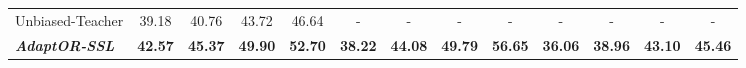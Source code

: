 \begin{table*}[htb!]
{\begin{tabular}{l|cccc|cccc|cccc}
			Unbiased-Teacher            & 39.18                                                            & 40.76                                                            & 43.72                                                             & 46.64          & -              & -              & -              & -              & -              & -              & -              & - \Tstrut              \\
			\emph{\textbf{AdaptOR-SSL}} & \textbf{42.57}                                                   & \textbf{45.37}                                                   & \textbf{49.90}                                                    & \textbf{52.70} & \textbf{38.22} & \textbf{44.08} & \textbf{49.79} & \textbf{56.65} & \textbf{36.06} & \textbf{38.96} & \textbf{43.10} & \textbf{45.46} \Tstrut \\ \hline
			\bottomrule
		\end{tabular}
	}
	\label{table:source:ssl}
	\vspace{-1mm}
\end{table*}

